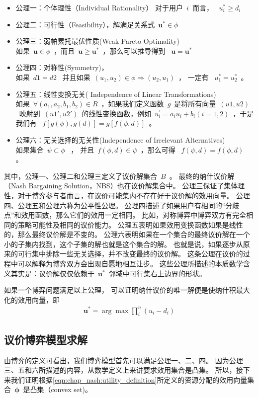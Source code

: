 \begin{itemize}
\item 公理一：个体理性（Individual Rationality） 
    对于用户~$i$~而言， ~$u_i^* \ge d_i$~
\item 公理二：可行性（Feasibility），解满足关系式~$\mathbf{u}^* \in \phi$~
\item 公理三：弱帕累托最优性质(Weak Pareto Optimality)\\
如果~$\mathbf{u} \in \phi$~，而且~$\mathbf{u} \ge \mathbf{u}^*$~，那么可以推导得到 ~$\mathbf{u} = \mathbf{u}^*$~
\item 公理四：对称性(Symmetry)，\\
如果~$d1=d2$~ 并且如果~$(u_1, u_2) \in \phi \Rightarrow (u_2, u_1) $~， 一定有 ~$u_1^*= u_2^*$~。
\item 公理五：线性变换无关( Independence of Linear Transformations)\\ 
如果~$\forall (a_1, a_2, b_1, b_2) \in R$~，如果我们定义函数~$g$~是将所有向量~$(u1, u2)$~映射到~$(u1', u2')$~的线性变换函数，例如~$u_i^\prime=a_iu_i+ b_i (i =1,2)$~，于是我们有 ~$f[g(\phi), g(d)]=g[f(\phi , d)]$~。
\item 公理六：无关选择的无关性(Independence of Irrelevant Alternatives) \\
如果集合~$\psi \subset \phi$~ ，
并且~$f(\phi,d) \in \psi$~，那么可得 ~$f(\psi,d) = f(\phi,d)$~ 。
\end{itemize}
其中，公理一、公理二和公理三定义了议价解集合~$B$~。
最终的纳什议价解（Nash Bargaining Solution，NBS）也在议价解集合中。
公理三保证了集体理性，对于博弈参与者而言，在议价可能集内不存在好于议价解的效用向量。
公理四、公理五和公理六称为公平性公理。
公理四描述了如果用户有相同的“分歧点”和效用函数，那么它们的效用一定相同。
比如，对称博弈中博弈双方有完全相同的策略可能性及相同的议价能力。
公理五表明如果效用变换函数如果是线性的，那么最终议价解是不变的。
公理六表明如果在一个集合的最终议价解在一个小的子集内找到，这个子集的解也就是这个集合的解。
也就是说，如果逐步从原来的可行集中排除一些无关选择，并不改变最终的议价解。
这条公理在议价的过程中可以解释为博弈双方会出现自愿地相互让步。
这些公理所描述的本质数学含义其实是：议价解仅仅依赖于~$\mathbf{u}^*$~邻域中可行集右上边界的形状。

如果一个博弈问题满足以上公理，
可以证明纳什议价的唯一解便是使纳什积最大化的效用向量\cite{Nash_1950}，即
\begin{align}
\mathbf{u}^* = \arg \max \prod_i^n (u_i-d_i)
\label{eqn:chap_nash:nash_product}
\end{align}

\subsection{议价博弈模型求解}
由博弈的定义可看出，我们博弈模型首先可以满足公理一、二、四。
因为公理三、五和六所描述的内容，从数学定义上来讲要求效用集合是凸集。
所以，接下来我们证明根据\eqref{eqn:chap_nash:utility_definition}所定义的资源分配的效用向量集合~$\mathbf{\phi}$~是凸集（convex set)。

